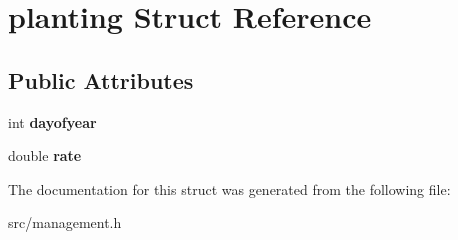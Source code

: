 \hypertarget{structplanting}{\section{planting Struct Reference}
\label{structplanting}
}
\subsection*{Public Attributes}
\begin{DoxyCompactItemize}
\item 
\hypertarget{structplanting_a023432f4d7ff512d86da8f9158e98fe8}{int {\bfseries dayofyear}}\label{structplanting_a023432f4d7ff512d86da8f9158e98fe8}

\item 
\hypertarget{structplanting_a5e5e2c05cae7cb27904e3cf004a3d641}{double {\bfseries rate}}\label{structplanting_a5e5e2c05cae7cb27904e3cf004a3d641}

\end{DoxyCompactItemize}


The documentation for this struct was generated from the following file\-:\begin{DoxyCompactItemize}
\item 
src/management.\-h\end{DoxyCompactItemize}
